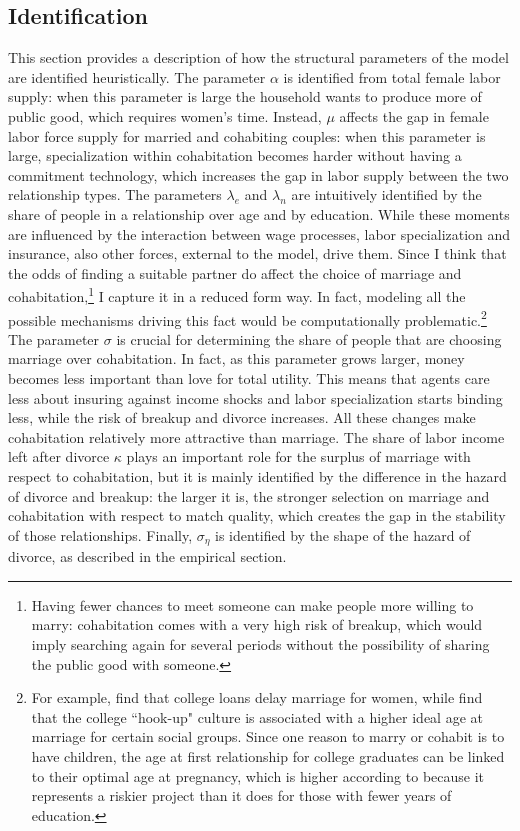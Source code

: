\documentclass[12pt]{article}
\begin{document}
 \subsection{Identification}
 This section provides a description of how the structural parameters of the model are identified heuristically. The parameter $\alpha$ is identified from total female labor supply: when this parameter is large the household wants to produce more of public good, which requires women's time. Instead, $\mu$ affects the gap in female labor force supply for married and cohabiting couples: when this parameter is large, specialization within cohabitation becomes harder without having a commitment technology, which increases the gap in labor supply between the two relationship types. The parameters $\lambda_e$ and $\lambda_n$ are intuitively identified by the share of people in a relationship over age and by education. While these moments are influenced by the interaction between wage processes, labor specialization and insurance, also other forces, external to the model, drive them. Since I think that the odds of finding a suitable partner do affect the choice of marriage and cohabitation,\footnote{Having fewer chances to meet someone can make people more willing to marry: cohabitation comes with a very high risk of breakup, which would imply searching again for several periods without the possibility of sharing the public good with someone.} I capture it in a reduced form way. In fact, modeling all the possible mechanisms driving this fact would be computationally problematic.\footnote{For example, \cite{bozick2014} find that college loans delay marriage for women, while \cite{allison2017} find that the college ``hook-up" culture is associated with a higher ideal age at marriage for certain social groups. Since one reason to marry or cohabit is to have children, the age at first relationship for college graduates can be linked to their optimal age at pregnancy, which is higher according to \cite{david2018} because it represents a riskier project than it does for those with fewer years of education.} The parameter $\sigma$ is crucial for determining the share of people that are choosing marriage over cohabitation. In  fact, as this parameter grows larger, money becomes less important than love for total utility. This means that agents care less about insuring against income shocks and labor specialization starts binding less, while the risk of breakup and divorce increases. All these changes make cohabitation relatively more attractive than marriage. The share of labor income left after divorce $\kappa$ plays an important role for the surplus of marriage with respect to cohabitation, but it is mainly identified by the difference in the hazard of divorce and breakup: the larger it is, the stronger selection on marriage and cohabitation with respect to match quality, which creates the gap in the stability of those relationships. Finally, $\sigma_{\eta}$ is identified by the shape of the hazard of divorce, as described in the empirical section.
\end{document}
